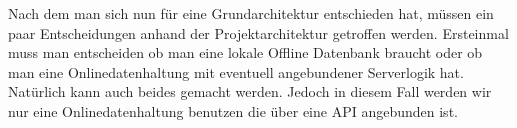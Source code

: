 Nach dem man sich nun für eine Grundarchitektur entschieden hat, müssen ein paar Entscheidungen anhand der Projektarchitektur getroffen werden. Ersteinmal muss man entscheiden ob man eine lokale Offline Datenbank braucht oder ob man eine Onlinedatenhaltung mit eventuell angebundener Serverlogik hat. Natürlich kann auch beides gemacht werden. Jedoch in diesem Fall werden wir nur eine Onlinedatenhaltung benutzen die über eine API angebunden ist. 